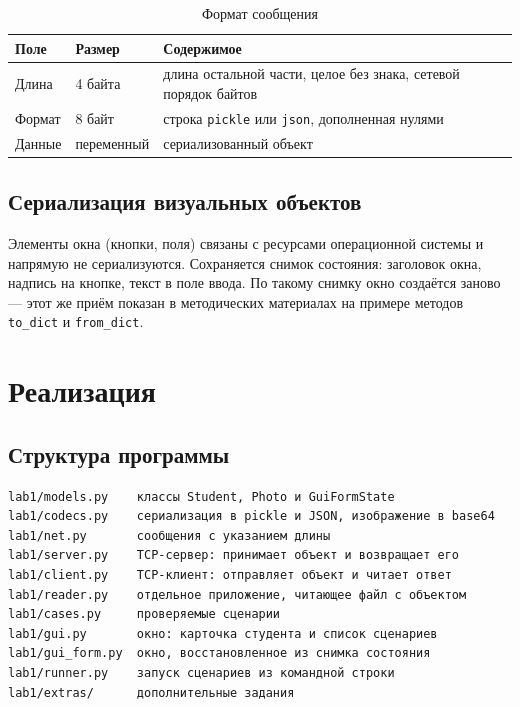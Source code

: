 \documentclass[14pt,a4paper]{extarticle}
\begin{document}
\begin{table}[H]
\caption{Формат сообщения}
\label{tab:frame}
\centering
\begin{tabularx}{\textwidth}{llL}
\toprule
Поле & Размер & Содержимое \\
\midrule
Длина & 4 байта & длина остальной части, целое без знака, сетевой порядок байтов \\
Формат & 8 байт & строка \texttt{pickle} или \texttt{json}, дополненная нулями \\
Данные & переменный & сериализованный объект \\
\bottomrule
\end{tabularx}
\end{table}

\subsection{Сериализация визуальных объектов}

Элементы окна (кнопки, поля) связаны с ресурсами операционной системы и напрямую не
сериализуются. Сохраняется снимок состояния: заголовок окна, надпись на кнопке, текст
в поле ввода. По такому снимку окно создаётся заново --- этот же приём показан в
методических материалах на примере методов \texttt{to\_dict} и \texttt{from\_dict}.

\section{Реализация}

\subsection{Структура программы}

\begin{Verbatim}[fontsize=\footnotesize, frame=single, samepage=true]
lab1/models.py    классы Student, Photo и GuiFormState
lab1/codecs.py    сериализация в pickle и JSON, изображение в base64
lab1/net.py       сообщения с указанием длины
lab1/server.py    TCP-сервер: принимает объект и возвращает его
lab1/client.py    TCP-клиент: отправляет объект и читает ответ
lab1/reader.py    отдельное приложение, читающее файл с объектом
lab1/cases.py     проверяемые сценарии
lab1/gui.py       окно: карточка студента и список сценариев
lab1/gui_form.py  окно, восстановленное из снимка состояния
lab1/runner.py    запуск сценариев из командной строки
lab1/extras/      дополнительные задания
\end{Verbatim}
\end{document}
